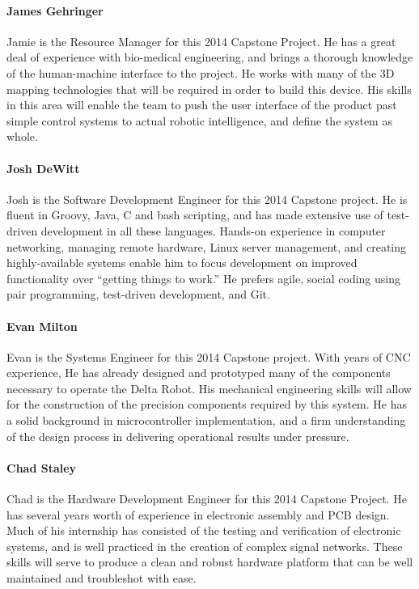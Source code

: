 \documentclass[11pt]{report}
\begin{document}
\paragraph{James Gehringer}
Jamie is the Resource Manager for this 2014 Capstone Project. He has a great deal of experience with bio-medical engineering, and brings a thorough knowledge of the human-machine interface to the project.
He works with many of the 3D mapping technologies that will be required in order to build this device.
His skills in this area will enable the team to push the user interface of the product past simple control systems to actual robotic intelligence, and define the system as whole.

\paragraph{Josh DeWitt}
Josh is the Software Development Engineer for this 2014 Capstone project.
He is fluent in Groovy, Java, C and bash scripting, and has made extensive use of test-driven development in all these languages.
Hands-on experience in computer networking, managing remote hardware, Linux server management, and creating highly-available systems enable him to focus development on improved functionality over “getting things to work.”
He prefers agile, social coding using pair programming, test-driven development, and Git. 

\paragraph{Evan Milton}
Evan is the Systems Engineer for this 2014 Capstone project.
With years of CNC experience, He has already designed and prototyped many of the components necessary to operate the Delta Robot.
His mechanical engineering skills will allow for the construction of the precision components required by this system.
He has a solid background in microcontroller implementation, and a firm understanding of the design process in delivering operational results under pressure.

\paragraph{Chad Staley}
Chad is the Hardware Development Engineer for this 2014 Capstone Project.
He has several years worth of experience in electronic assembly and PCB design.
Much of his internship has consisted of the testing and verification of electronic systems, and is well practiced in the creation of complex signal networks.
These skills will serve to produce a clean and robust hardware platform that can be well maintained and troubleshot with ease.
\end{document}
